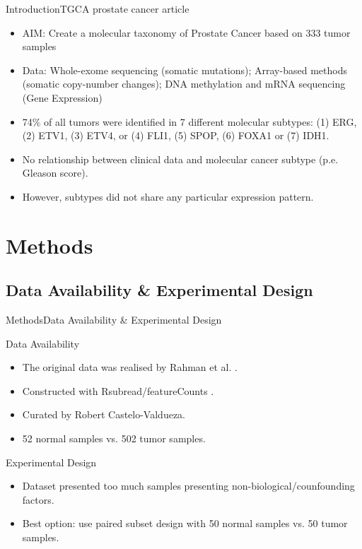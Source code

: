 \documentclass{beamer}
\begin{document}
\begin{frame}{Introduction}{TGCA prostate cancer article}
  \begin{itemize}
  \item<1-> {
    AIM: Create a molecular taxonomy of Prostate Cancer based on 333 tumor samples
    \pause %
  }
  \item<2-> {   
	Data: Whole-exome sequencing (somatic mutations); Array-based methods (somatic copy-number changes); DNA 		methylation and mRNA sequencing (Gene Expression)  
  }
  \item<3-> {
    74\% of all tumors were identified in 7 different molecular subtypes: (1) ERG, (2) ETV1, (3) ETV4, or (4) FLI1, (5) SPOP, (6) FOXA1 or (7) IDH1.
  }
  \item<4-> {
  	No relationship between clinical data and molecular cancer subtype (p.e. Gleason score).
  }
  \item<5->{
  	However, subtypes did not share any particular expression pattern. 
  }
  \end{itemize}
\end{frame}

\section{Methods}

\subsection{Data Availability \& Experimental Design}

\begin{frame}{Methods}{Data Availability \& Experimental Design}
	\begin{block}{Data Availability}
		\begin{itemize}
			\item The original data was realised by Rahman et al. \cite{Rahman15112015} .
			\item Constructed with Rsubread/featureCounts \cite{Rsubread}.
			\item Curated by Robert Castelo-Valdueza.
			\item 52 normal samples vs. 502 tumor samples.
		\end{itemize}
	\end{block}
	
	\begin{block}{Experimental Design}
		\begin{itemize}
			\item Dataset presented too much samples presenting non-biological/counfounding factors.
			\item Best option: use paired subset design with 50 normal samples vs. 50 tumor samples.
		\end{itemize}
	\end{block}

\end{frame}
\end{document}
